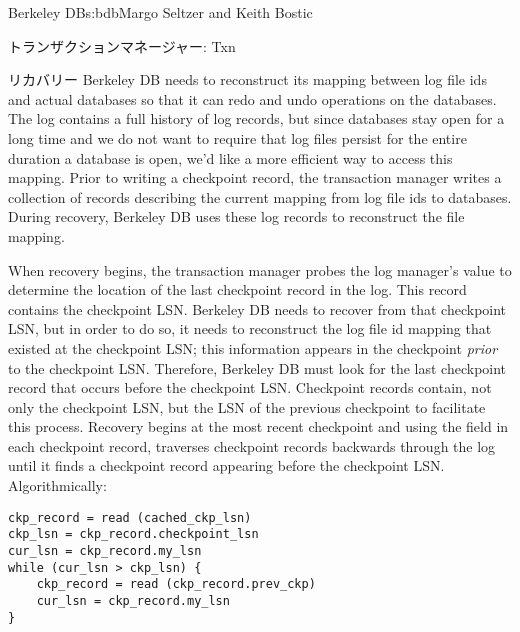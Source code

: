 \begin{aosachapter}{Berkeley DB}{s:bdb}{Margo Seltzer and Keith Bostic}
\begin{aosasect1}{トランザクションマネージャー: Txn}
\begin{aosasect2}{リカバリー}
Berkeley DB needs to reconstruct its mapping between log file ids and
actual databases so that it can redo and undo operations on the
databases. The log contains a full history of 
log records, but since databases stay open for a long time and we do
not want to require that log files persist for the entire duration a
database is open, we'd like a more efficient way to access this
mapping. Prior to writing a checkpoint record, the transaction manager
writes a collection of  records describing the
current mapping from log file ids to databases.  During recovery,
Berkeley DB uses these log records to reconstruct the file mapping.

When recovery begins, the transaction manager probes the log manager's
 value to determine the location of the last
checkpoint record in the log. This record contains the checkpoint LSN.
Berkeley DB needs to recover from that checkpoint LSN, but in order to
do so, it needs to reconstruct the log file id mapping that existed at
the checkpoint LSN; this information appears in the checkpoint
\emph{prior} to the checkpoint LSN\@. Therefore, Berkeley DB must look
for the last checkpoint record that occurs before the checkpoint LSN.
Checkpoint records contain, not only the checkpoint LSN, but the LSN
of the previous checkpoint to facilitate this process. Recovery begins
at the most recent checkpoint and using the  field in
each checkpoint record, traverses checkpoint records backwards through
the log until it finds a checkpoint record appearing
before the checkpoint LSN\@. Algorithmically:

\vspace{-0.2cm}
\begin{verbatim}
ckp_record = read (cached_ckp_lsn)
ckp_lsn = ckp_record.checkpoint_lsn
cur_lsn = ckp_record.my_lsn
while (cur_lsn > ckp_lsn) {
    ckp_record = read (ckp_record.prev_ckp)
    cur_lsn = ckp_record.my_lsn
}
\end{verbatim}
\vspace{-0.2cm}


\end{aosasect2}
\end{aosasect1}
\end{aosachapter}
